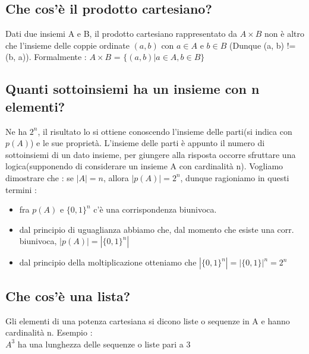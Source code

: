 \documentclass[a4paper,12pt]{report}
\begin{document}
	\subsection{Che cos'è il prodotto cartesiano?}
	Dati due insiemi A e B, il prodotto cartesiano rappresentato da $A \times B$ non è altro che l'insieme delle coppie ordinate $(a, b)$ con $a \in A$ e $b \in B$ (Dunque (a, b) != (b, a)). Formalmente : $A \times B$ = $\{(a, b) | a \in A, b \in B \}$
	\subsection{Quanti sottoinsiemi ha un insieme con n elementi?}
	Ne ha $2^n$, il risultato lo si ottiene conoscendo l'insieme delle parti(si indica con $p(A)$) e le sue proprietà.
	L'insieme delle parti è appunto il numero di sottoinsiemi di un dato insieme, per giungere alla risposta occorre sfruttare una logica(supponendo di considerare un insieme A con cardinalità n).
	Vogliamo dimostrare che : se $|A| = n$, allora $|p(A)| = 2^n$, dunque ragioniamo in questi termini : 
	\begin{itemize}
		\item fra $p(A)$ e $\{0, 1\}^n$ c'è una corrispondenza biunivoca.
		\item dal principio di uguaglianza abbiamo che, dal momento che esiste una corr. biunivoca,  $|p(A)| = |\{0, 1\}^n|$
		\item dal principio della moltiplicazione otteniamo che $|\{0, 1\}^n| = |\{0,1\}|^n = 2^n$  
	\end{itemize}
	\subsection{Che cos'è una lista?}
	Gli elementi di una potenza cartesiana si dicono liste o sequenze in A e hanno cardinalità n.
	Esempio : \\
	$A^3$ ha una lunghezza delle sequenze o liste pari a 3
\end{document}
